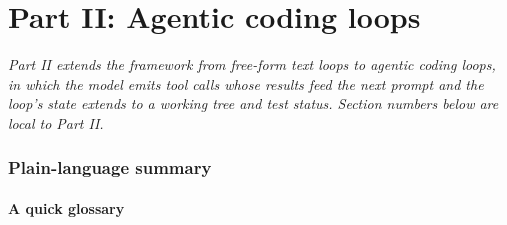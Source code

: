 \documentclass{article}
\theoremstyle{plain}
\theoremstyle{definition}
\begin{document}
\clearpage
\part*{Part II: Agentic coding loops}
\setcounter{section}{0}
\renewcommand{\thesection}{\arabic{section}}

\noindent\emph{Part II extends the framework from free-form text loops to
agentic coding loops, in which the model emits tool calls whose results
feed the next prompt and the loop's state extends to a working tree and
test status. Section numbers below are local to Part II.}



\section*{Plain-language summary}

\subsection*{A quick glossary}
\end{document}
